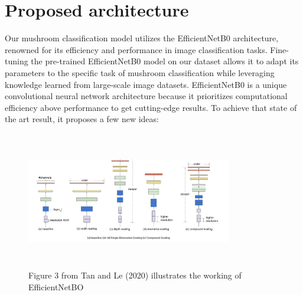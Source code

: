 \section{Proposed architecture}
Our mushroom classification model utilizes the EfficientNetB0 architecture, renowned for its efficiency and performance in image classification tasks. Fine-tuning the pre-trained EfficientNetB0 model on our dataset allows it to adapt its parameters to the specific task of mushroom classification while leveraging knowledge learned from large-scale image datasets.
EfficientNetB0 is a unique convolutional neural network architecture because it prioritizes computational efficiency above performance to get cutting-edge results. To achieve that state of the art result, it proposes a few new ideas:
\begin{figure}[!ht]
    \centering
    \includegraphics[height=6cm, width=9cm]{images/effwork.jpg}
    \caption{Figure 3 from Tan and Le (2020) illustrates the working of EfficientNetBO}
\end{figure}
